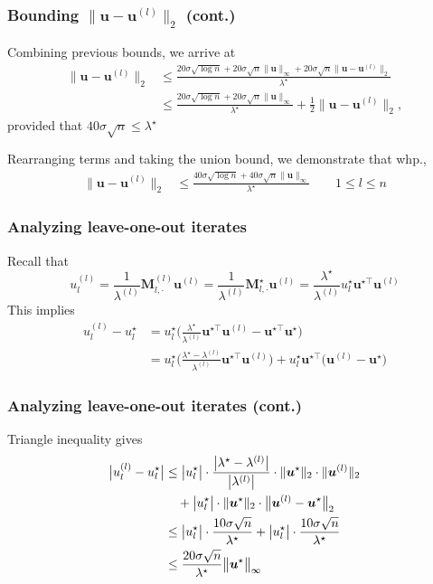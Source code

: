 \documentclass[compress,
mathserif,wide,%
]{beamer}
\begin{document}
\begin{frame}
	\frametitle{Bounding $\|\bm{u} - \bm{u}^{(l)}\|_{2}$ (cont.)}
	Combining previous bounds, we arrive at
\begin{align*}
\big\|\bm{u}-\bm{u}^{(l)}\big\|_{2}
 & \leq \frac{20\sigma\sqrt{\log n}+20\sigma\sqrt{n}\|\bm{u}\|_{\infty}+20\sigma\sqrt{n}\big\|\bm{u}-\bm{u}^{(l)}\big\|_{2}}{\lambda^{\star}}\\
 & \leq\frac{20\sigma\sqrt{\log n}+20\sigma\sqrt{n}\|\bm{u}\|_{\infty}}{\lambda^{\star}}+\frac{1}{2}\big\|\bm{u}-\bm{u}^{(l)}\big\|_{2},
\end{align*}
%
provided that $40\sigma\sqrt{n}\leq \lambda^{\star}$



Rearranging terms and taking the union bound, we demonstrate that whp.,
%
\begin{align*}
\big\|\bm{u}-\bm{u}^{(l)}\big\|_{2} & \leq\frac{40\sigma\sqrt{\log n}+40\sigma\sqrt{n}\|\bm{u}\|_{\infty}}{\lambda^{\star}}  \qquad 1\leq l\leq n
\end{align*}
\end{frame}



\begin{frame}
	\frametitle{Analyzing leave-one-out iterates}
	Recall that 
	\[
	u_{l}^{(l)} =\frac{1}{\lambda^{(l)}}\bm{M}_{l,\cdot}^{(l)}\bm{u}^{(l)}=\frac{1}{\lambda^{(l)}}\bm{M}_{l,\cdot}^{\star}\bm{u}^{(l)}=\frac{\lambda^{\star}}{\lambda^{(l)}}u_{l}^{\star}\bm{u}^{\star\top}\bm{u}^{(l)}
	\]
	This implies 
	\begin{align*}
u_{l}^{(l)}-u_{l}^{\star} & %
=u_{l}^{\star}\Big(\frac{\lambda^{\star}}{\lambda^{(l)}}\bm{u}^{\star\top}\bm{u}^{(l)}-\bm{u}^{\star\top}\bm{u}^{\star}\Big)\\
 & =u_{l}^{\star}\Big(\frac{\lambda^{\star}-\lambda^{(l)}}{\lambda^{(l)}}\bm{u}^{\star\top}\bm{u}^{(l)}\Big)+u_{l}^{\star}\bm{u}^{\star\top}\big(\bm{u}^{(l)}-\bm{u}^{\star}\big)
\end{align*}
\end{frame}

\begin{frame}
	\frametitle{Analyzing leave-one-out iterates (cont.)}
	Triangle inequality gives
\begin{align*}
\big|u_{l}^{(l)}-u_{l}^{\star}\big|
& \leq\big|u_{l}^{\star}\big|\cdot\frac{\big|\lambda^{\star}-\lambda^{(l)}\big|}{\big|\lambda^{(l)}\big|} \cdot \|\bm{u}^{\star}\|_{2} \cdot \|\bm{u}^{(l)}\|_{2} \\
&\quad
	+ \big|u_{l}^{\star}\big|\cdot\|\bm{u}^{\star}\|_{2} \cdot \big\|\bm{u}^{(l)}-\bm{u}^{\star}\big\|_{2} \notag\\
 & \leq\big|u_{l}^{\star}\big|\cdot\frac{10\sigma\sqrt{n}}{\lambda^{\star}}+\big|u_{l}^{\star}\big|\cdot\frac{10\sigma\sqrt{n}}{\lambda^{\star}} \notag\\
 & \leq  \frac{20\sigma\sqrt{n}}{\lambda^{\star}} \big\|\bm{u}^{\star}\big\|_{\infty}
\end{align*}
\end{frame}
\end{document}
